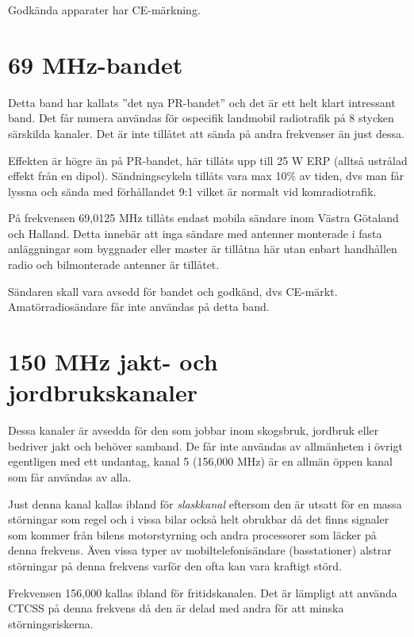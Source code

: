 Godkända apparater har CE-märkning.

\section{69 MHz-bandet}

Detta band har kallats ''det nya PR-bandet'' och det är ett helt klart intressant band. Det får numera användas för ospecifik landmobil radiotrafik på 8 stycken särskilda kanaler. Det är inte tillåtet att sända på andra frekvenser än just dessa.

Effekten är högre än på PR-bandet, här tillåts upp till 25 W ERP (alltså ustrålad effekt från en dipol). Sändningscykeln tillåts vara max 10\% av tiden, dvs man får lyssna och sända med förhållandet 9:1 vilket är normalt vid komradiotrafik.

På frekvensen 69,0125 MHz tillåts endast mobila sändare inom Västra Götaland och Halland. Detta innebär att inga sändare med antenner monterade i fasta anläggningar som byggnader eller master är tillåtna här utan enbart handhållen radio och bilmonterade antenner är tillåtet.

Sändaren skall vara avsedd för bandet och godkänd, dvs CE-märkt. Amatörradiosändare får inte användas på detta band.


\section{150 MHz jakt- och jordbrukskanaler}

Dessa kanaler är avsedda för den som jobbar inom skogsbruk, jordbruk eller bedriver jakt och behöver samband. De får inte användas av allmänheten i övrigt egentligen med ett undantag, kanal 5 (156,000 MHz) är en allmän öppen kanal som får användas av alla.

Just denna kanal kallas ibland för \textit{slaskkanal} eftersom den är utsatt för en massa störningar som regel och i vissa bilar också helt obrukbar då det finns signaler som kommer från bilens motorstyrning och andra processorer som läcker på denna frekvens. Även vissa typer av mobiltelefonisändare (basstationer) alstrar störningar på denna frekvens varför den ofta kan vara kraftigt störd.

Frekvensen 156,000 kallas ibland för fritidskanalen. Det är lämpligt att använda CTCSS på denna frekvens då den är delad med andra för att minska störningsriskerna.

